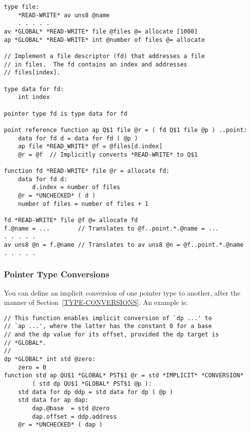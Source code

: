 \documentclass[12pt]{article}
\newenvironment{indpar}[1][0.3in]%
	{\begin{list}{}%
		     {\setlength{\itemsep}{0in}%
		      \setlength{\topsep}{0in}%
		      \setlength{\parsep}{1ex}%
		      \setlength{\labelwidth}{#1}%
		      \setlength{\leftmargin}{#1}%
		      \addtolength{\leftmargin}{\labelsep}}%
	 \item}%
	{\end{list}}
\begin{document}
\begin{indpar}\begin{verbatim}
type file:
    *READ-WRITE* av uns8 @name
    . . . . .
av *GLOBAL* *READ-WRITE* file @files @= allocate [1000]
ap *GLOBAL* *READ-WRITE* int @number of files @= allocate

// Implement a file descriptor (fd) that addresses a file
// in files.  The fd contains an index and addresses
// files[index].

type data for fd:
    int index

pointer type fd is type data for fd

point reference function ap Q$1 file @r = ( fd Q$1 file @p ) ..point:
    data for fd d = data for fd ( @p )
    ap file *READ_WRITE* @f = @files[d.index]
    @r = @f  // Implicitly converts *READ-WRITE* to Q$1

function fd *READ-WRITE* file @r = allocate fd:
    data for fd d:
        d.index = number of files
    @r = *UNCHECKED* ( d )
    number of files = number of files + 1

fd *READ-WRITE* file @f @= allocate fd
f.@name = ...        // Translates to @f..point.*.@name = ...
. . . . .
av uns8 @n = f.@name // Translates to av uns8 @n = @f..point.*.@name
. . . . .
\end{verbatim}\end{indpar}

\subsubsection{Pointer Type Conversions}
\label{POINTER-TYPE-CONVERSIONS}

You can define an implicit conversion of one pointer type
to another, after the manner of Section~\ref{TYPE-CONVERSIONS}.
An example is:

\begin{indpar}\begin{verbatim}
// This function enables implicit conversion of `dp ...' to
// `ap ...', where the latter has the constant 0 for a base
// and the dp value for its offset, provided the dp target is
// *GLOBAL*.
//
dp *GLOBAL* int std @zero:
    zero = 0
function std ap QU$1 *GLOBAL* PST$1 @r = std *IMPLICIT* *CONVERSION*
        ( std dp QU$1 *GLOBAL* PST$1 @p ):
    std data for dp ddp = std data for dp ( @p )
    std data for ap dap:
        dap.@base  = std @zero
        dap.offset = ddp.address
    @r = *UNCHECKED* ( dap )
\end{verbatim}\end{indpar}
\end{document}
